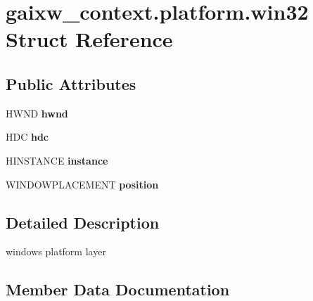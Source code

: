 \hypertarget{structgaixw__context_8platform_8win32}{}\section{gaixw\+\_\+context.\+platform.\+win32 Struct Reference}
\label{structgaixw__context_8platform_8win32}
\subsection*{Public Attributes}
\begin{DoxyCompactItemize}
\item 
\mbox{\label{structgaixw__context_8platform_8win32_aa8f1d3a09754838672b9d72d0a9255cc}} 
H\+W\+ND {\bfseries hwnd}
\item 
\mbox{\label{structgaixw__context_8platform_8win32_a5b593c651bda77f2b449220326ad4346}} 
H\+DC {\bfseries hdc}
\item 
\mbox{\label{structgaixw__context_8platform_8win32_a7123a699d77db6479a1d8ece2c4f1c16}} 
H\+I\+N\+S\+T\+A\+N\+CE {\bfseries instance}
\item 
\mbox{\label{structgaixw__context_8platform_8win32_a4757fe07fd492a8be0ea6a760d683d6e}} 
W\+I\+N\+D\+O\+W\+P\+L\+A\+C\+E\+M\+E\+NT {\bfseries position}
\end{DoxyCompactItemize}


\subsection{Detailed Description}
windows platform layer 

\subsection{Member Data Documentation}
\mbox{\label{structgaixw__context_8platform_8win32_a5b593c651bda77f2b449220326ad4346}} 
